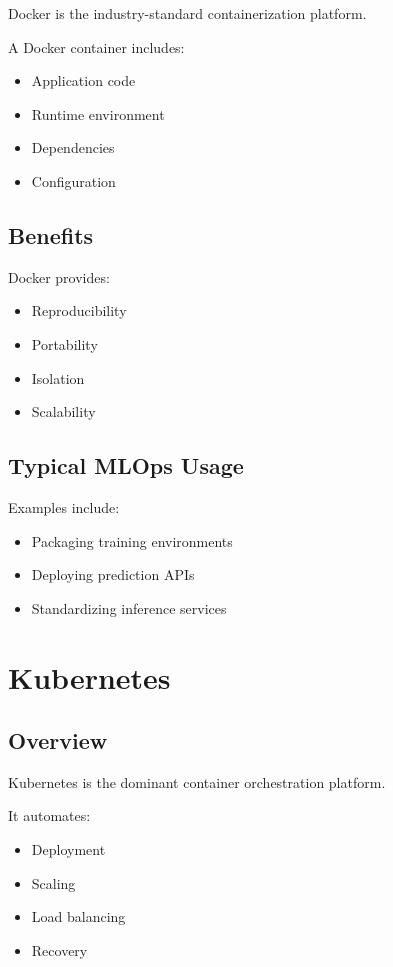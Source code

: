 Docker is the industry-standard containerization platform.

A Docker container includes:

\begin{itemize}
    \item Application code
    \item Runtime environment
    \item Dependencies
    \item Configuration
\end{itemize}

\subsection{Benefits}

Docker provides:

\begin{itemize}
    \item Reproducibility
    \item Portability
    \item Isolation
    \item Scalability
\end{itemize}

\subsection{Typical MLOps Usage}

Examples include:

\begin{itemize}
    \item Packaging training environments
    \item Deploying prediction APIs
    \item Standardizing inference services
\end{itemize}

\section{Kubernetes}

\subsection{Overview}

Kubernetes is the dominant container orchestration platform.

It automates:

\begin{itemize}
    \item Deployment
    \item Scaling
    \item Load balancing
    \item Recovery
\end{itemize}

